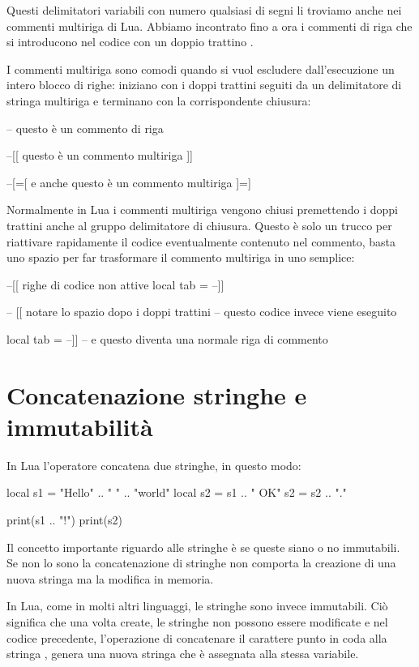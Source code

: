 Questi delimitatori variabili con numero qualsiasi di segni \key{=} li troviamo
anche nei commenti multiriga di Lua. Abbiamo incontrato fino a ora i commenti di
riga che si introducono nel codice con un doppio trattino \key{--}.

I commenti multiriga sono comodi quando si vuol escludere dall'esecuzione un
intero blocco di righe: iniziano con i doppi trattini seguiti da un delimitatore
di stringa multiriga e terminano con la corrispondente chiusura:
\begin{lines}
-- questo è un commento di riga

--[[
questo è un commento
multiriga
]]

--[=[
e anche questo è un commento
multiriga
]=]
\end{lines}

Normalmente in Lua i commenti multiriga vengono chiusi premettendo i doppi
trattini anche al gruppo delimitatore di chiusura. Questo è solo un trucco per
riattivare rapidamente il codice eventualmente contenuto nel commento, basta uno
spazio per far trasformare il commento multiriga in uno semplice:
\begin{lines}
--[[ righe di codice non attive
local tab = {}
--]]

-- [[ notare lo spazio dopo i doppi trattini
-- questo codice invece viene eseguito

local tab = {}
--]] -- e questo diventa una normale riga di commento
\end{lines}


\section{Concatenazione stringhe e immutabilità}

In Lua l'operatore  concatena due stringhe, in questo modo:
\begin{linesrun}
local s1 = "Hello" .. " " .. "world"
local s2 = s1 .. " OK"
s2 = s2 .. "."

print(s1 .. "!")
print(s2)
\end{linesrun}

Il concetto importante riguardo alle stringhe è se queste siano o no immutabili.
Se non lo sono la concatenazione di stringhe non comporta la creazione di una
nuova stringa ma la modifica in memoria.

In Lua, come in molti altri linguaggi, le stringhe sono invece immutabili.
Ciò significa che una volta create, le stringhe non possono essere modificate e
nel codice precedente, l'operazione di concatenare il carattere punto in coda
alla stringa , genera una nuova stringa che è assegnata alla stessa
variabile.

